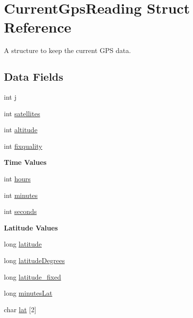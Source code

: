 \hypertarget{struct_current_gps_reading}{}\section{Current\+Gps\+Reading Struct Reference}
\label{struct_current_gps_reading}


A structure to keep the current G\+P\+S data.  


\subsection*{Data Fields}
\begin{DoxyCompactItemize}
\item 
int \hyperlink{struct_current_gps_reading_a37d972ae0b47b9099e30983131d31916}{j}
\item 
int \hyperlink{struct_current_gps_reading_a691915f3fb4792e167a2351c6e932483}{satellites}
\item 
int \hyperlink{struct_current_gps_reading_a9e54ec2d7e031746f3e5b03e7c36a28e}{altitude}
\item 
int \hyperlink{struct_current_gps_reading_a5fc94f0bd71207a944918191dbba4c44}{fixquality}
\end{DoxyCompactItemize}
\begin{Indent}{\bf Time Values}\par
\begin{DoxyCompactItemize}
\item 
int \hyperlink{struct_current_gps_reading_af23005df06fc3cd4264e5eee2dfa2f8c}{hours}
\item 
int \hyperlink{struct_current_gps_reading_ab693b677bdc9ded12b06daf49778101c}{minutes}
\item 
int \hyperlink{struct_current_gps_reading_a77bd4f876bdc3afed5acdd936f775d34}{seconds}
\end{DoxyCompactItemize}
\end{Indent}
\begin{Indent}{\bf Latitude Values}\par
\begin{DoxyCompactItemize}
\item 
long \hyperlink{struct_current_gps_reading_a04bf03d81f573f06783641463a84ae29}{latitude}
\item 
long \hyperlink{struct_current_gps_reading_aa3c709569d317a96ed8adb103f97f92b}{latitude\+Degrees}
\item 
long \hyperlink{struct_current_gps_reading_a636fa3631a9a6236e7dfbf2bb7e6030d}{latitude\+\_\+fixed}
\item 
long \hyperlink{struct_current_gps_reading_aa17df66ce835adf67ec6fbaf721b62c6}{minutes\+Lat}
\item 
char \hyperlink{struct_current_gps_reading_aa4087acf248a5b20278f44c9abe2fa62}{lat} \mbox{[}2\mbox{]}
\end{DoxyCompactItemize}
\end{Indent}

